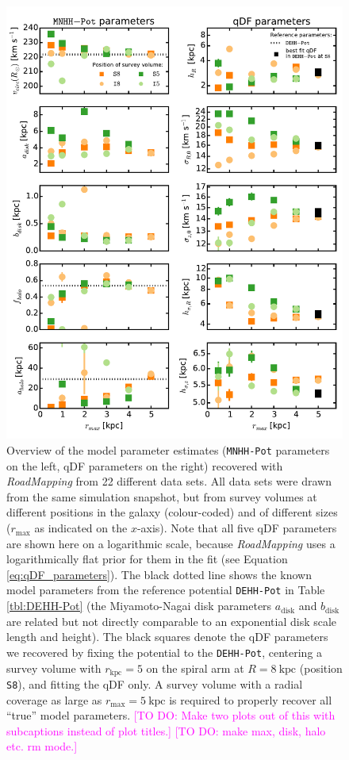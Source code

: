 \documentclass[iop,revtex4,numberedappendix,appendixfloats]{emulateapj}
\newcommand{\RM}{{\sl RoadMapping}}
\newcommand{\Wilma}[1]{\textcolor{Magenta}{#1}}
\begin{document}
\begin{figure}[!htbp]
\centering
\includegraphics[width=\columnwidth]{fig/MNdHHdiffSph2_violins_3.pdf}
\caption{Overview of the model parameter estimates (\texttt{MNHH-Pot} parameters on the left, qDF parameters on the right) recovered with \RM{} from 22 different data sets. All data sets were drawn from the same simulation snapshot, but from survey volumes at different positions in the galaxy (colour-coded) and of different sizes ($r_\text{max}$ as indicated on the $x$-axis). Note that all five qDF parameters are shown here on a logarithmic scale, because \RM{} uses a logarithmically flat prior for them in the fit (see Equation \eqref{eq:qDF_parameters}). The black dotted line shows the known model parameters from the reference potential \texttt{DEHH-Pot} in Table \ref{tbl:DEHH-Pot} (the Miyamoto-Nagai disk parameters $a_\text{disk}$ and $b_\text{disk}$ are related but not directly comparable to an exponential disk scale length and height). The black squares denote the qDF parameters we recovered by fixing the potential to the \texttt{DEHH-Pot}, centering a survey volume with $r_\text{kpc}=5$ on the spiral arm at $R=8~\text{kpc}$ (position \texttt{S8}), and fitting the qDF only. A survey volume with a radial coverage as large as $r_\text{max}=5~\text{kpc}$ is required to properly recover all ``true'' model parameters. \Wilma{[TO DO: Make two plots out of this with subcaptions instead of plot titles.]} \Wilma{[TO DO: make max, disk, halo etc. rm mode.]}}
\label{fig:model_parameters}
\end{figure}
\end{document}

